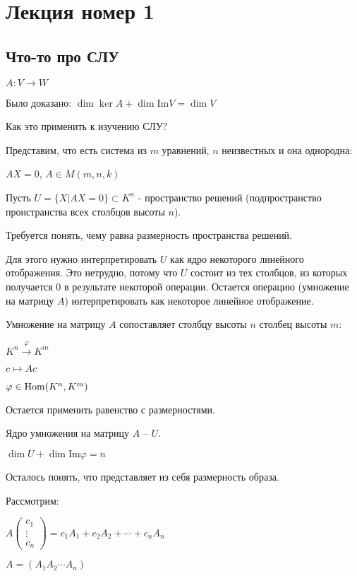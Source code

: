 \section{Лекция номер 1}

\subsection{Что-то про СЛУ}

$A: V \rightarrow W$

Было доказано: $\dim{\ker{A}} + \dim{\mathrm{Im}{V}} = \dim{V}$

Как это применить к изучению СЛУ?

Представим, что есть система из $m$ уравнений, $n$ неизвестных и она однородна: 

$AX = 0$, $A\in M(m, n, k)$

Пусть $U = \{ X | AX = 0 \} \subset K^n$ - пространство решений (подпространство пронстранства всех столбцов высоты $n$).

Требуется понять, чему равна размерность пространства решений. 

Для этого нужно интерпретировать $U$ как ядро некоторого линейного отображения. Это нетрудно, потому что $U$ состоит из тех столбцов, из которых получается 0 в результате некоторой операции. Остается операцию (умножение на матрицу $A$) интерпретировать как некоторое линейное отображение. 

Умножение на матрицу $A$ сопоставляет столбцу высоты $n$ столбец высоты $m$: 

$K^n \stackrel{\varphi}{\rightarrow} K^m$

$c \mapsto  Ac$

$\varphi \in \operatorname{Hom}(K^n, K^m)$

Остается применить равенство с размерностями.

Ядро умножения на матрицу $A$ – $U$.

$\dim{U} + \dim{\mathrm{Im}{\varphi}} = n$

Осталось понять, что представляет из себя размерность образа.

Рассмотрим:

$A \left(
  \begin{matrix}
  c_1 \\ 
  \vdots \\
  c_n
\end{matrix}
\right) = c_1A_1 + c_2A_2 + \cdots + c_nA_n$

$A = (A_1A_2\cdots A_n)$

